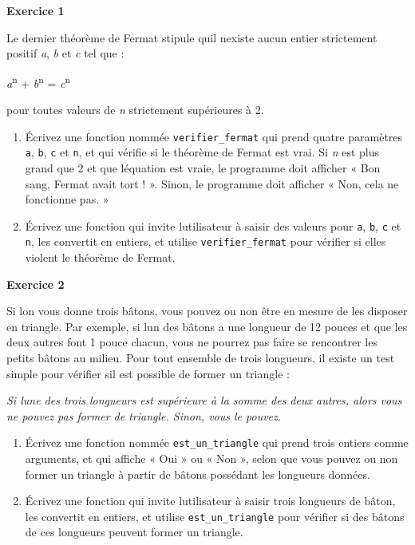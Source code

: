 \textbf{Exercice 1}

Le dernier théorème de Fermat stipule qu\textquotesingle il
n\textquotesingle existe aucun entier strictement positif \emph{a},
\emph{b} et \emph{c} tel que :

\emph{a}\textsuperscript{n} + \emph{b}\textsuperscript{n} =
\emph{c}\textsuperscript{n}

pour toutes valeurs de \emph{n} strictement supérieures à 2.

\begin{enumerate}
\def\labelenumi{\arabic{enumi}.}
\tightlist
\item
  Écrivez une fonction nommée \texttt{verifier\_fermat} qui prend quatre
  paramètres \texttt{a}, \texttt{b}, \texttt{c} et \texttt{n}, et qui
  vérifie si le théorème de Fermat est vrai. Si \emph{n} est plus grand
  que 2 et que l\textquotesingle équation est vraie, le programme doit
  afficher « Bon sang, Fermat avait tort ! ». Sinon, le programme doit
  afficher « Non, cela ne fonctionne pas. »
\item
  Écrivez une fonction qui invite l\textquotesingle utilisateur à saisir
  des valeurs pour \texttt{a}, \texttt{b}, \texttt{c} et \texttt{n}, les
  convertit en entiers, et utilise \texttt{verifier\_fermat} pour
  vérifier si elles violent le théorème de Fermat.
\end{enumerate}

\textbf{Exercice 2}

Si l\textquotesingle on vous donne trois bâtons, vous pouvez ou non être
en mesure de les disposer en triangle. Par exemple, si
l\textquotesingle un des bâtons a une longueur de 12 pouces et que les
deux autres font 1 pouce chacun, vous ne pourrez pas faire se rencontrer
les petits bâtons au milieu. Pour tout ensemble de trois longueurs, il
existe un test simple pour vérifier s\textquotesingle il est possible de
former un triangle :

\emph{Si l\textquotesingle une des trois longueurs est supérieure à la
somme des deux autres, alors vous ne pouvez pas former de triangle.
Sinon, vous le pouvez.}

\begin{enumerate}
\def\labelenumi{\arabic{enumi}.}
\tightlist
\item
  Écrivez une fonction nommée \texttt{est\_un\_triangle} qui prend trois
  entiers comme arguments, et qui affiche « Oui » ou « Non », selon que
  vous pouvez ou non former un triangle à partir de bâtons possédant les
  longueurs données.
\item
  Écrivez une fonction qui invite l\textquotesingle utilisateur à saisir
  trois longueurs de bâton, les convertit en entiers, et utilise
  \texttt{est\_un\_triangle} pour vérifier si des bâtons de ces
  longueurs peuvent former un triangle.
\end{enumerate}

